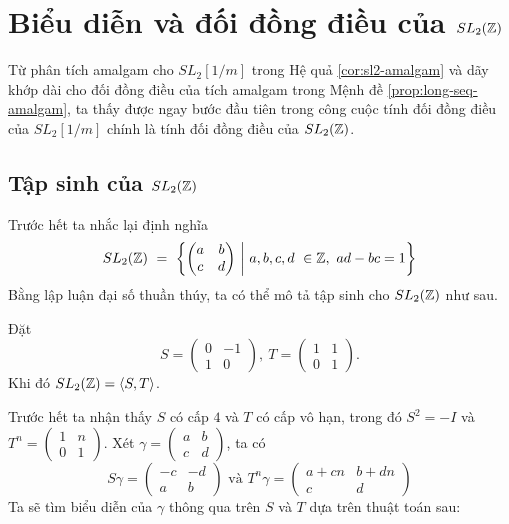 \chapter{Biểu diễn và đối đồng điều của $SL_2(\mathbb Z)$}
Từ phân tích amalgam cho $SL_2[1/m]$ trong Hệ quả \ref{cor:sl2-amalgam} và dãy khớp dài cho đối đồng điều của tích amalgam trong Mệnh đề \ref{prop:long-seq-amalgam}, ta thấy được ngay bước đầu tiên trong công cuộc tính đối đồng điều của $SL_2[1/m]$ chính là tính đối đồng điều của $SL_2(\mathbb Z)$.

\section{Tập sinh của $SL_2(\mathbb Z)$}
Trước hết ta nhắc lại định nghĩa
$$
    SL_{2}(\Z) \ =\ \left\{\begin{pmatrix}
        a & b \\
        c & d
    \end{pmatrix} \ \middle\vert\ a,b,c,d\ \in \Z,\ ad-bc=1\right\}
$$
Bằng lập luận đại số thuần thúy, ta có thể mô tả tập sinh cho $SL_2(\mathbb Z)$ như sau.

\begin{proposition}
    Đặt
    $$
        S = \begin{pmatrix}
            0 & -1 \\
            1 & 0
        \end{pmatrix} ,\ T=\begin{pmatrix}
            1 & 1 \\
            0 & 1
        \end{pmatrix}.
    $$
    Khi đó $SL_2(\mathbb Z) = \langle S, T \rangle$.
\end{proposition}

\startproof Trước hết ta nhận thấy $S$ có cấp $4$ và $T$ có cấp vô hạn, trong đó $S^{2} = -I$ và $T^{n} =\begin{pmatrix}
        1 & n \\
        0 & 1
    \end{pmatrix}$. Xét $\gamma = \begin{pmatrix}
        a & b \\
        c & d
    \end{pmatrix}$, ta có
$$
    S\gamma =\begin{pmatrix}
        -c & -d \\
        a  & b
    \end{pmatrix} \text{ và } T^{n} \gamma =\begin{pmatrix}
        a+cn & b+dn \\
        c    & d
    \end{pmatrix}
$$
Ta sẽ tìm biểu diễn của $\gamma$ thông qua trên $S$ và $T$ dựa trên thuật toán sau:

